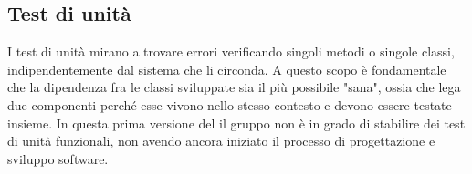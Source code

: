 \subsection{Test di unità}
I test di unità mirano a trovare errori verificando singoli metodi o singole classi, indipendentemente dal sistema che li circonda. A questo scopo è fondamentale che la dipendenza fra le classi sviluppate sia il più possibile "sana", ossia che lega due componenti perché esse vivono nello stesso contesto e devono essere testate insieme. 
In questa prima versione del \PdQv{}il gruppo non è in grado di stabilire dei test di unità funzionali, non avendo ancora iniziato il processo di progettazione e sviluppo software.